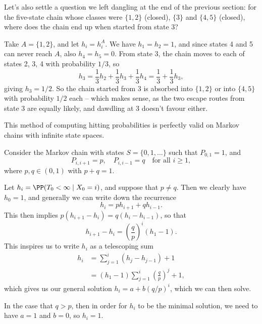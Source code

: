 \documentclass[a4paper]{scrartcl}
\begin{document}
Let's also settle a question we left dangling at the end of the previous section: for the five-state chain whose classes were $\{1, 2\}$ (closed), $\{3\}$ and $\{4, 5\}$ (closed), where does the chain end up when started from state 3?

\begin{example}
	Take $A = \{1, 2\}$, and let $h_i = h_i^A$. We have $h_1 = h_2 = 1$, and since states 4 and 5 can never reach $A$, also $h_4 = h_5 = 0$. From state 3, the chain moves to each of states 2, 3, 4 with probability $1/3$, so
	$$
	h_3 = \frac{1}{3}h_2 + \frac{1}{3}h_3 + \frac{1}{3}h_4 = \frac{1}{3} + \frac{1}{3}h_3,
	$$
	giving $h_3 = 1/2$. So the chain started from 3 is absorbed into $\{1, 2\}$ or into $\{4, 5\}$ with probability $1/2$ each -- which makes sense, as the two escape routes from state 3 are equally likely, and dawdling at 3 doesn't favour either.
\end{example}

This method of computing hitting probabilities is perfectly valid on Markov chains with infinite state spaces.

\begin{example}
	Consider the Markov chain with states $S = \{0, 1, \dots\}$ such that $P_{0, 1} = 1$, and
	$$
	P_{i, i+1} = p, \quad P_{i, i - 1} = q \quad \text{for all } i \geq 1,
	$$ 
	where $p, q \in (0, 1)$ with $p + q = 1$.

	\begin{center}
		\end{center}

	Let $h_i = \PP(T_0 < \infty \mid X_0 = i)$, and suppose that $p \neq q$. Then we clearly have $h_0 = 1$, and generally we can write down the recurrence 
	$$
		h_i = p h_{i + 1} + qh_{i - 1}.
	$$
	This then implies $p(h_{i + 1} - h_i) = q(h_{i} - h_{i - 1})$, so that
	$$
		h_{i+1} - h_{i}  = \left(\frac{q}{p}\right)^i (h_1 - 1).
	$$
	This inspires us to write $h_i$ as a telescoping sum
	\begin{align*}
		h_i &= \sum_{j = 1}^i (h_j - h_{j - 1}) + 1  \\
			&= (h_1 - 1) \sum_{j = 1}^i \left(\frac{q}{p}\right)^j + 1,
	\end{align*}
	which gives us our general solution $h_i = a + b(q/p)^i$, which we can then solve.

	In the case that $q > p$, then in order for $h_i$ to be the minimal solution, we need to have $a = 1$ and $b = 0$, so $h_i = 1$.
\end{example}
\end{document}
